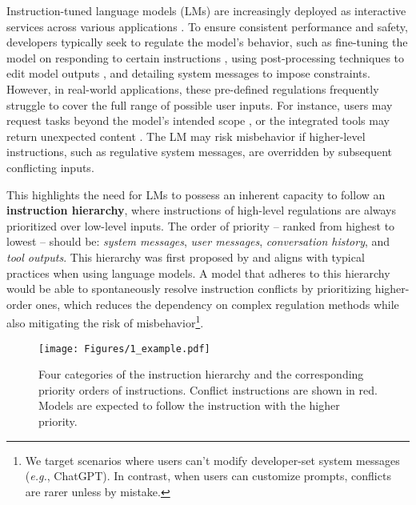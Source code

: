 

Instruction-tuned language models (LMs) are increasingly deployed as interactive services across various applications \citep{GPT4,qwen2,deepseek}. To ensure consistent performance and safety, developers typically seek to regulate the model's behavior, such as fine-tuning the model on responding to certain instructions \citep{llama2}, using post-processing techniques to edit model outputs \citep{output-edit-black-box-lm}, and detailing system messages to impose constraints\citep{claude-system-prompt}. However, in real-world applications, these pre-defined regulations frequently struggle to cover the full range of possible user inputs. For instance, users may request tasks beyond the model's intended scope \citep{model_spec}, or the integrated tools may return unexpected content \citep{injecagent}. 
The LM may risk misbehavior if higher-level instructions, such as regulative system messages, are overridden by subsequent conflicting inputs.

This highlights the need for LMs to possess an inherent capacity to follow an \textbf{instruction hierarchy}, where instructions of high-level regulations are always prioritized over low-level inputs. The order of priority -- ranked from highest to lowest -- should be: \textit{system messages}, \textit{user messages}, \textit{conversation history}, and \textit{tool outputs}. This hierarchy was first proposed by \citet{instruction_hierarchy} and aligns with typical practices when using language models. A model that adheres to this hierarchy would be able to spontaneously resolve instruction conflicts by prioritizing higher-order ones, which reduces the dependency on complex regulation methods while also mitigating the risk of misbehavior\footnote{We target scenarios where users can't modify developer-set system messages (\textit{e.g.}, ChatGPT). In contrast, when users can customize prompts, conflicts are rarer unless by mistake.}.

\begin{figure*}[t]
      \centering
      \texttt{[image: Figures/1\_example.pdf]}
      \vspace{-0.6cm}
      \caption{Four categories of the instruction hierarchy and the corresponding priority orders of instructions. Conflict instructions are shown in {\color{red}red}. Models are expected to follow the instruction with the higher priority.}
      \label{fig:example}
      \vspace{-0.2cm}
\end{figure*}

